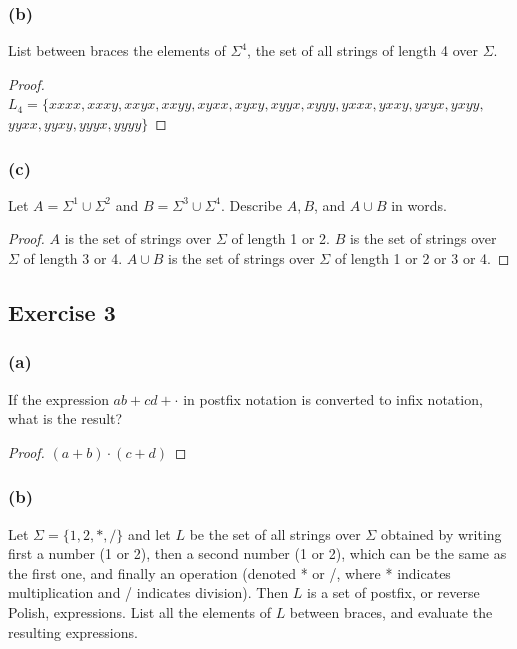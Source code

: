 \documentclass[14pt]{extarticle}
\begin{document}
\subsubsection{(b)}
List between braces the elements of \(\Sigma^4\), the set of all strings of length 4 over \(\Sigma\).

\begin{proof}
\(L_4 = \{xxxx, xxxy, xxyx, xxyy, xyxx, xyxy, xyyx, xyyy, yxxx, yxxy, yxyx, yxyy,\) \\
\(yyxx, yyxy, yyyx, yyyy\}\)
\end{proof}

\subsubsection{(c)}
Let \(A = \Sigma^1 \cup \Sigma^2\) and \(B = \Sigma^3 \cup \Sigma^4\). Describe \(A, B\), and \(A \cup B\) in words.

\begin{proof}
\(A\) is the set of strings over \(\Sigma\) of length 1 or 2.
\(B\) is the set of strings over \(\Sigma\) of length 3 or 4.
\(A \cup B\) is the set of strings over \(\Sigma\) of length 1 or 2 or 3 or 4.
\end{proof}

\subsection{Exercise 3}
\subsubsection{(a)}
If the expression \(ab + cd + \cdot\) in postfix notation is converted to infix notation, what is the result?

\begin{proof}
\((a + b)\cdot(c + d)\)
\end{proof}

\subsubsection{(b)}
Let \(\Sigma = \{1, 2, *, /\}\) and let \(L\) be the set of all strings over \(\Sigma\) obtained by writing first a number 
(1 or 2), then a second number (1 or 2), which can be the same as the first one, and finally an operation (denoted * or /, 
where * indicates multiplication and / indicates division). Then \(L\) is a set of postfix, or reverse Polish, 
expressions. List all the elements of \(L\) between braces, and evaluate the resulting expressions.
\end{document}
